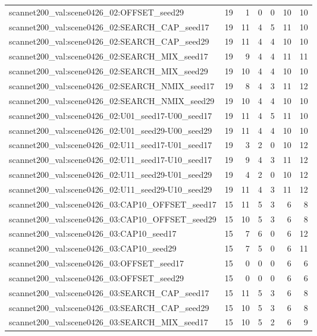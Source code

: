 \begin{table}[t]
\begin{tabular}{lrrrrrr}
scannet200\_val:scene0426\_02:OFFSET\_seed29 & 19 & 1 & 0 & 0 & 10 & 10 \\
scannet200\_val:scene0426\_02:SEARCH\_CAP\_seed17 & 19 & 11 & 4 & 5 & 11 & 10 \\
scannet200\_val:scene0426\_02:SEARCH\_CAP\_seed29 & 19 & 11 & 4 & 4 & 10 & 10 \\
scannet200\_val:scene0426\_02:SEARCH\_MIX\_seed17 & 19 & 9 & 4 & 4 & 11 & 11 \\
scannet200\_val:scene0426\_02:SEARCH\_MIX\_seed29 & 19 & 10 & 4 & 4 & 10 & 10 \\
scannet200\_val:scene0426\_02:SEARCH\_NMIX\_seed17 & 19 & 8 & 4 & 3 & 11 & 12 \\
scannet200\_val:scene0426\_02:SEARCH\_NMIX\_seed29 & 19 & 10 & 4 & 4 & 10 & 10 \\
scannet200\_val:scene0426\_02:U01\_seed17-U00\_seed17 & 19 & 11 & 4 & 5 & 11 & 10 \\
scannet200\_val:scene0426\_02:U01\_seed29-U00\_seed29 & 19 & 11 & 4 & 4 & 10 & 10 \\
scannet200\_val:scene0426\_02:U11\_seed17-U01\_seed17 & 19 & 3 & 2 & 0 & 10 & 12 \\
scannet200\_val:scene0426\_02:U11\_seed17-U10\_seed17 & 19 & 9 & 4 & 3 & 11 & 12 \\
scannet200\_val:scene0426\_02:U11\_seed29-U01\_seed29 & 19 & 4 & 2 & 0 & 10 & 12 \\
scannet200\_val:scene0426\_02:U11\_seed29-U10\_seed29 & 19 & 11 & 4 & 3 & 11 & 12 \\
scannet200\_val:scene0426\_03:CAP10\_OFFSET\_seed17 & 15 & 11 & 5 & 3 & 6 & 8 \\
scannet200\_val:scene0426\_03:CAP10\_OFFSET\_seed29 & 15 & 10 & 5 & 3 & 6 & 8 \\
scannet200\_val:scene0426\_03:CAP10\_seed17 & 15 & 7 & 6 & 0 & 6 & 12 \\
scannet200\_val:scene0426\_03:CAP10\_seed29 & 15 & 7 & 5 & 0 & 6 & 11 \\
scannet200\_val:scene0426\_03:OFFSET\_seed17 & 15 & 0 & 0 & 0 & 6 & 6 \\
scannet200\_val:scene0426\_03:OFFSET\_seed29 & 15 & 0 & 0 & 0 & 6 & 6 \\
scannet200\_val:scene0426\_03:SEARCH\_CAP\_seed17 & 15 & 11 & 5 & 3 & 6 & 8 \\
scannet200\_val:scene0426\_03:SEARCH\_CAP\_seed29 & 15 & 10 & 5 & 3 & 6 & 8 \\
scannet200\_val:scene0426\_03:SEARCH\_MIX\_seed17 & 15 & 10 & 5 & 2 & 6 & 9 \\

\end{tabular}
\end{table}
